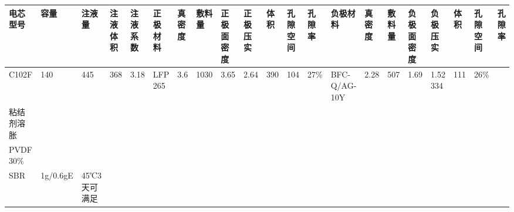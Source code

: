 \begin{table}[!ht]
    \centering
    \begin{tabular}{|l|l|l|l|l|l|l|l|l|l|l|l|l|l|l|l|l|l|l|l|l|}
    \hline
        电芯型号 & 容量 & 注液量 & 注液体积 & 注液系数 & 正极材料 & 真密度 & 敷料量 & 正极面密度 & 正极压实 & 体积 & 孔隙空间 & 孔隙率 & 负极材料 & 真密度 & 敷料量 & 负极面密度 & 负极压实 & 体积 & 孔隙空间 & 孔隙率 \\ \hline
        C102F & 140 & 445 & 368 & 3.18 & LFP 265 & 3.6 & 1030 & 3.65 & 2.64 & 390 & 104 & 27\% & BFC-Q/AG-10Y & 2.28 & 507 & 1.69 & 1.52  334 & 111 & 26\% & ~ \\ \hline
        粘结剂溶胀 & ~ & ~ & ~ & ~ & ~ & ~ & ~ & ~ & ~ & ~ & ~ & ~ & ~ & ~ & ~ & ~ & ~ & ~ & ~ & ~ \\ \hline
        PVDF    30\% & ~ & ~ & ~ & ~ & ~ & ~ & ~ & ~ & ~ & ~ & ~ & ~ & ~ & ~ & ~ & ~ & ~ & ~ & ~ & ~ \\ \hline
        SBR & 1g/0.6gE & 45℃3天可满足 & ~ & ~ & ~ & ~ & ~ & ~ & ~ & ~ & ~ & ~ & ~ & ~ & ~ & ~ & ~ & ~ & ~ & ~ \\ \hline
    \end{tabular}
\end{table}